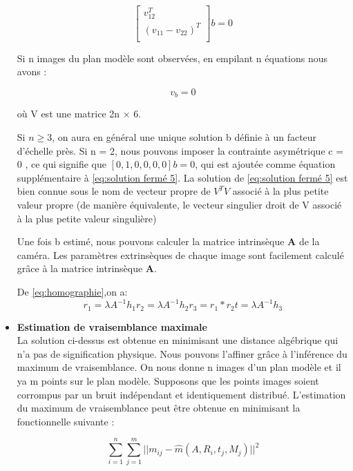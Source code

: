 \begin{itemize}[label={\Huge$\star$}]
 \begin{equation}
  \left[ 
  \begin{array}{c}
  	 v_{12}^{T} \\
  	 (v_{11}-v_{22})^{T}\\
  \end{array} \right]b
  =
  0
\label{eq:solution fermé 4}
\end{equation}

 Si n images du plan modèle sont observées, en empilant n équations nous avons :
 
  \begin{equation}
 v_b = 0
 \label{eq:solution fermé 5}
 \end{equation}
 
 où V est une matrice 2n × 6. 
 
Si $n \geq 3$, on aura en général une unique solution b définie à un facteur d'échelle près.
Si n = 2, nous pouvons imposer la contrainte asymétrique c = 0 , ce qui signifie que $[0, 1, 0, 0, 0, 0]b = 0$, qui est ajoutée comme équation supplémentaire à \ref{eq:solution fermé 5}. La solution de \ref{eq:solution fermé 5} est bien connue sous le nom de vecteur propre de $V^{T}V$ associé à la plus petite valeur propre (de manière équivalente, le vecteur singulier droit de V associé à la plus petite valeur singulière)
 
 Une fois b estimé, nous pouvons calculer la matrice intrinsèque \textbf{A} de la caméra.  
 Les paramètres extrinsèques de chaque image sont facilement calculé grâce à la matrice  intrinsèque \textbf{A}.
 
 De \ref{eq:homographie},on a: 
 \[
 r_{1}=\lambda A^{-1}h_{1}
 r_{2}=\lambda A^{-1}h_{2}
 r_{3}=r_{1}*r_{2}
 t=\lambda A^{-1}h_{3}
 \]
 
 
\item \textbf{Estimation de vraisemblance maximale} 
 \\
 
 La solution ci-dessus est obtenue en minimisant une distance 
 algébrique qui n'a pas de signification physique. Nous pouvons l’affiner 
 grâce à l’inférence du maximum de vraisemblance.
 On nous donne n images d’un plan modèle et il ya m points sur le 
 plan modèle. Supposons que les points images soient corrompus par un 
 bruit indépendant et identiquement distribué.
 L'estimation du maximum de vraisemblance peut être obtenue en minimisant la fonctionnelle suivante :
 
 \begin{equation}
 \sum_{i=1}^{n} \sum_{j=1}^{m} 
 ||m_{ij}-\hat{m}(A,R_{i},t_{j},M_{j})||^{2}
 \label{eq:maximum}
\end{equation}
 

\end{itemize}
